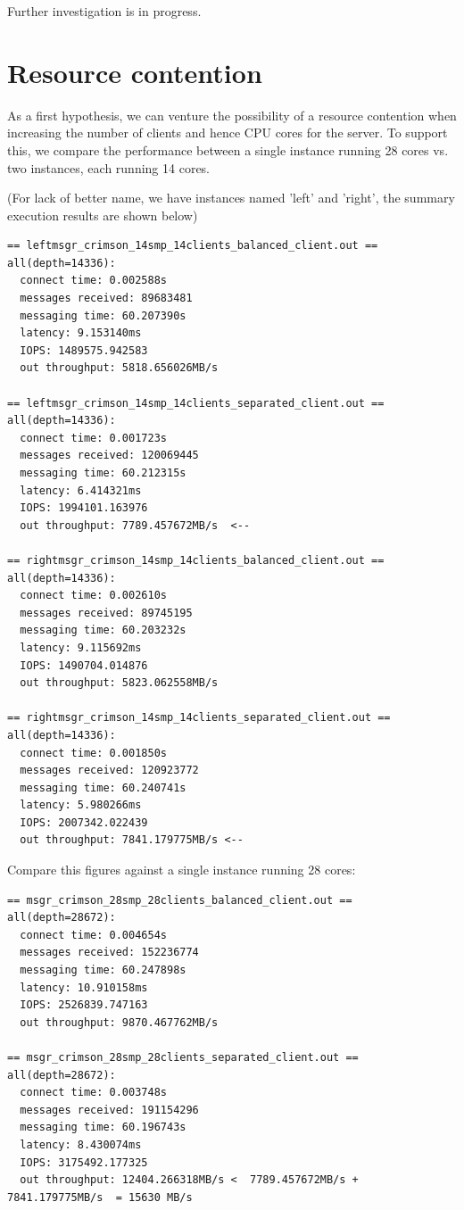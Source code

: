 Further investigation is in progress.

\section{Resource contention}

As a first hypothesis, we can venture the possibility of a resource contention
when increasing the number of clients and hence CPU cores for the server. To
support this, we compare the performance between a single instance running 28
cores vs. two instances, each running 14 cores.

(For lack of better name, we have instances named 'left' and 'right', the summary execution results are shown below)
{\small
\begin{verbatim}
== leftmsgr_crimson_14smp_14clients_balanced_client.out ==
all(depth=14336):
  connect time: 0.002588s
  messages received: 89683481
  messaging time: 60.207390s
  latency: 9.153140ms
  IOPS: 1489575.942583
  out throughput: 5818.656026MB/s

== leftmsgr_crimson_14smp_14clients_separated_client.out ==
all(depth=14336):
  connect time: 0.001723s
  messages received: 120069445
  messaging time: 60.212315s
  latency: 6.414321ms
  IOPS: 1994101.163976
  out throughput: 7789.457672MB/s  <--

== rightmsgr_crimson_14smp_14clients_balanced_client.out ==
all(depth=14336):
  connect time: 0.002610s
  messages received: 89745195
  messaging time: 60.203232s
  latency: 9.115692ms
  IOPS: 1490704.014876
  out throughput: 5823.062558MB/s

== rightmsgr_crimson_14smp_14clients_separated_client.out ==
all(depth=14336):
  connect time: 0.001850s
  messages received: 120923772
  messaging time: 60.240741s
  latency: 5.980266ms
  IOPS: 2007342.022439
  out throughput: 7841.179775MB/s <--

\end{verbatim}
}

Compare this figures against a single instance running 28 cores:

{\small
\begin{verbatim}
== msgr_crimson_28smp_28clients_balanced_client.out ==
all(depth=28672):
  connect time: 0.004654s
  messages received: 152236774
  messaging time: 60.247898s
  latency: 10.910158ms
  IOPS: 2526839.747163
  out throughput: 9870.467762MB/s

== msgr_crimson_28smp_28clients_separated_client.out ==
all(depth=28672):
  connect time: 0.003748s
  messages received: 191154296
  messaging time: 60.196743s
  latency: 8.430074ms
  IOPS: 3175492.177325
  out throughput: 12404.266318MB/s <  7789.457672MB/s + 7841.179775MB/s  = 15630 MB/s
\end{verbatim}
}

